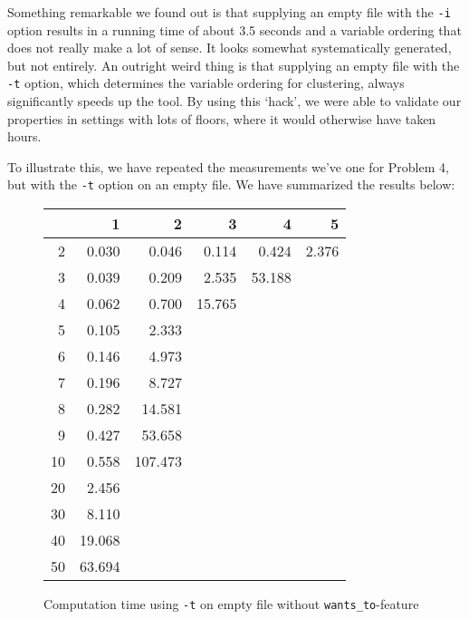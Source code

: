 \documentclass[a4paper,10pt]{article}
\begin{document}
	Something remarkable we found out is that supplying an empty file with the \texttt{-i} option results in a running time of about 3.5 seconds and a variable ordering that does not really make a lot of sense. It looks somewhat systematically generated, but not entirely. An outright weird thing is that supplying an empty file with the \texttt{-t} option, which determines the variable ordering for clustering, always significantly speeds up the tool. By using this `hack', we were able to validate our properties in settings with lots of floors, where it would otherwise have taken hours.
	
	To illustrate this, we have repeated the measurements we've one for Problem 4, but with the \texttt{-t} option on an empty file. We have summarized the results below:
	
	\begin{figure}[H]
		\begin{center}
			\begin{tabular}{r|r|r|r|r|r}
				\backslashbox{$F$}{$n$} & 1 & 2 & 3 & 4 & 5 \\ \hline
				2	& 0.030		& 0.046		& 0.114		& 0.424		& 2.376	\\ \hline
				3	& 0.039		& 0.209		& 2.535		& 53.188	&		\\ \hline
				4	& 0.062		& 0.700		& 15.765	&			&		\\ \hline
				5	& 0.105		& 2.333		&			&			&		\\ \hline
				6	& 0.146		& 4.973		&			&			&		\\ \hline 
				7	& 0.196		& 8.727		&			&			&		\\ \hline
				8	& 0.282		& 14.581	&			&			&		\\ \hline
				9	& 0.427		& 53.658	&			&			&		\\ \hline
				10	& 0.558		& 107.473	&			&			&		\\ \hline
				20	& 2.456		&			&			&			&		\\ \hline
				30	& 8.110		&			&			&			&		\\ \hline
				40	& 19.068	&			&			&			&		\\ \hline
				50	& 63.694	&			&			&			&		\\ \hline
			\end{tabular}
		\end{center}
		
		\caption{Computation time using \texttt{-t} on empty file without \texttt{wants\_to}-feature}
	\end{figure}
	
\end{document}
